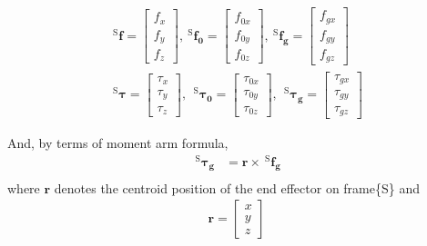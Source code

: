 \begin{equation*}
\begin{split}
\ ^\mathrm{S}\!\boldsymbol{f} = 
\begin{bmatrix}
f_{x}	\\
f_{y}	\\
f_{z}
\end{bmatrix},\ 
^\mathrm{S}\!\boldsymbol{f_0} = 
\begin{bmatrix}
f_{0x}	\\
f_{0y}	\\
f_{0z}
\end{bmatrix},\ 
^\mathrm{S}\!\boldsymbol{f_g} = 
\begin{bmatrix}
f_{gx}	\\
f_{gy}	\\
f_{gz}
\end{bmatrix}\\
\ ^\mathrm{S}\boldsymbol{\tau} = 
\begin{bmatrix}
\tau_{x}		\\
\tau_{y}		\\
\tau_{z}	
\end{bmatrix},\ 
\ ^\mathrm{S}\boldsymbol{\tau_0} = 
\begin{bmatrix}
\tau_{0x}		\\
\tau_{0y}		\\
\tau_{0z}	
\end{bmatrix},\ 
\ ^\mathrm{S}\boldsymbol{\tau_g} = 
\begin{bmatrix}
\tau_{gx}		\\
\tau_{gy}		\\
\tau_{gz}	
\end{bmatrix}
\end{split}
\end{equation*}
\par\noindent
And, by terms of moment arm formula,
\begin{equation}
\label{eq:moment arm}
\begin{split}
\ ^\mathrm{S}\boldsymbol{\tau_g}	&= \boldsymbol{r} \times \ ^\mathrm{S}\!\boldsymbol{f_g} \\
\end{split}
\end{equation}
where $\boldsymbol{r}$ denotes the centroid position of the end effector on frame\{S\} and 
\begin{equation*}
\begin{split}
\boldsymbol{r}
=
\begin{bmatrix}
x		\\
y		\\
z	
\end{bmatrix}
\end{split}
\end{equation*}

